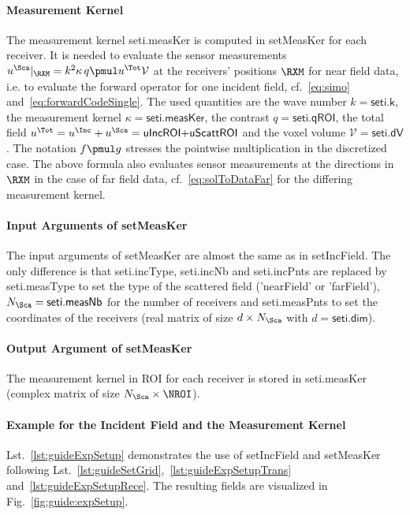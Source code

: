 \documentclass[a4paper]{article}
\begin{document}
\paragraph{Measurement Kernel} The measurement kernel \textsf{seti.measKer} is computed in \textsf{setMeasKer} for each receiver. It is needed to evaluate the sensor measurements $u^\Sca|_\RXM = k^2 \kappa\, q \pmul u^\Tot \mathcal{V}$ at the receivers' positions $\RXM$ for near field data, i.e. to evaluate the forward operator for one incident field, cf.~\eqref{eq:simo} and~\eqref{eq:forwardCodeSingle}. The used quantities are the wave number $k = \textsf{seti.k}$, the measurement kernel $\kappa = \textsf{seti.measKer}$, the contrast $q = \textsf{seti.qROI}$, the total field $u^\Tot = u^\Inc+u^\Sca = \textsf{uIncROI+uScattROI}$ and the voxel volume $\mathcal{V} = \textsf{seti.dV}$. The notation $f \pmul g$ stresses the pointwise multiplication in the discretized case. The above formula also evaluates sensor measurements at the directions in $\RXM$ in the case of far field data, cf.~\eqref{eq:solToDataFar} for the differing measurement kernel.

\paragraph{Input Arguments of \textsf{setMeasKer}} The input arguments of \textsf{setMeasKer} are almost the same as in \textsf{setIncField}. The only difference is that \textsf{seti.incType}, \textsf{seti.incNb} and \textsf{seti.incPnts} are replaced by \textsf{seti.measType} to set the type of the scattered field (\textsf{'nearField'} or \textsf{'farField'}), $N_\Sca = \textsf{seti.measNb}$ for the number of receivers and \textsf{seti.measPnts} to set the coordinates of the receivers (real matrix of size $d \times N_\Sca$ with $d = \textsf{seti.dim}$).

\paragraph{Output Argument of \textsf{setMeasKer}} The measurement kernel in ROI for each receiver is stored in \textsf{seti.measKer} (complex matrix of size $N_\Sca \times \NROI$).

\paragraph{Example for the Incident Field and the Measurement Kernel} Lst.~\ref{lst:guideExpSetup} demonstrates the use of \textsf{setIncField} and \textsf{setMeasKer} following Lst.~\ref{lst:guideSetGrid},~\ref{lst:guideExpSetupTrans} and~\ref{lst:guideExpSetupRece}. The resulting fields are visualized in Fig.~\ref{fig:guide:expSetup}.
\end{document}
